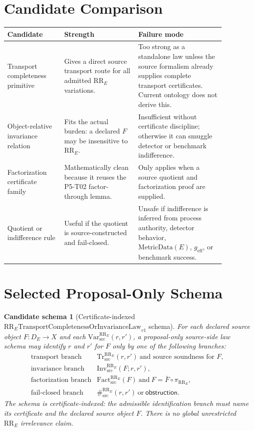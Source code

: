 \documentclass[11pt]{article}
\newcommand{\RRE}{\mathrm{RR}_{E}}
\newcommand{\VarRR}{\mathrm{Var}^{\RRE}_{\mathrm{src}}}
\newcommand{\TrRR}{\mathrm{Tr}^{\RRE}_{\mathrm{src}}}
\newcommand{\InvRR}{\mathrm{Inv}^{\RRE}_{\mathrm{src}}}
\newcommand{\FactRR}{\mathrm{Fact}^{\RRE}_{\mathrm{src}}}
\newcommand{\SepRR}{\#^{\RRE}_{\mathrm{src}}}
\newcommand{\LawRR}{\mathrm{RR}_{E}\mathrm{TransportCompletenessOrInvarianceLaw}_{v1}}
\newcommand{\MetricData}{\mathrm{MetricData}}
\newcommand{\geff}{g_{\mathrm{eff}}}
\newcommand{\Obstruction}{\mathsf{obstruction}}
\newtheorem{schema}{Candidate schema}
\begin{document}
\section{Candidate Comparison}

\begin{longtable}{p{0.23\linewidth}p{0.30\linewidth}p{0.35\linewidth}}
\toprule
Candidate & Strength & Failure mode \\
\midrule
Transport completeness primitive &
Gives a direct source transport route for all admitted \(\RRE\) variations. &
Too strong as a standalone law unless the source formalism already supplies
complete transport certificates. Current ontology does not derive this. \\
Object-relative invariance relation &
Fits the actual burden: a declared \(F\) may be insensitive to \(\RRE\). &
Insufficient without certificate discipline; otherwise it can smuggle detector
or benchmark indifference. \\
Factorization certificate family &
Mathematically clean because it reuses the P5-T02 factor-through lemma. &
Only applies when a source quotient and factorization proof are supplied. \\
Quotient or indifference rule &
Useful if the quotient is source-constructed and fail-closed. &
Unsafe if indifference is inferred from process authority, detector behavior,
\(\MetricData(E)\), \(\geff\), or benchmark success. \\
\bottomrule
\end{longtable}

\section{Selected Proposal-Only Schema}

\begin{schema}[Certificate-indexed \(\LawRR\) schema]
For each declared source object \(F:D_E\to X\) and each
\(\VarRR(r,r')\), a proposal-only source-side law schema may identify \(r\)
and \(r'\) for \(F\) only by one of the following branches:
\[
\begin{array}{ll}
\text{transport branch} & \TrRR(r,r')\ \text{and source soundness for }F, \\
\text{invariance branch} & \InvRR(F;r,r'), \\
\text{factorization branch} & \FactRR(F)\ \text{and}\ F=\bar F\circ\pi_{\RRE}, \\
\text{fail-closed branch} & \SepRR(r,r')\ \text{or}\ \Obstruction .
\end{array}
\]
The schema is certificate-indexed: the admissible identification branch must
name its certificate and the declared source object \(F\). There is no global
unrestricted \(\RRE\) irrelevance claim.
\end{schema}
\end{document}
